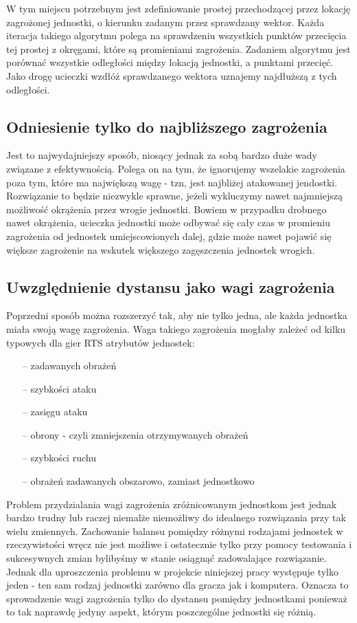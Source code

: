 \documentclass[12pt]{report}
\begin{document}
W tym miejscu potrzebnym jest zdefiniowanie prostej przechodzącej przez lokację zagrożonej jednostki, o kierunku zadanym przez sprawdzany wektor. Każda iteracja takiego algorytmu polega na sprawdzeniu wszystkich punktów przecięcia tej prostej z okręgami, które są promieniami zagrożenia. Zadaniem algorytmu jest porównać wszystkie odległości między lokacją jednostki, a punktami przecięć. Jako drogę ucieczki wzdłóż sprawdzanego wektora uznajemy najdłuższą z tych odległości.

\subsection{Odniesienie tylko do najbliższego zagrożenia}
Jest to najwydajniejszy sposób, niosący jednak za sobą bardzo duże wady związane z efektywnością. Polega on na tym, że ignorujemy wszelakie zagrożenia poza tym, które ma największą wagę - tzn, jest najbliżej atakowanej jendostki. Rozwiązanie to będzie niezwykle sprawne, jeżeli wykluczymy nawet najmniejszą możliwość okrążenia przez wrogie jednostki. Bowiem w przypadku drobnego nawet okrążenia, ucieczka jednostki może odbywać się cały czas w promieniu zagrożenia od jednostek umiejscowionych dalej, gdzie może nawet pojawić się większe zagrożenie na wskutek większego zagęszczenia jednostek wrogich.
\subsection{Uwzględnienie dystansu jako wagi zagrożenia}
Poprzedni sposób można rozszerzyć tak, aby nie tylko jedna, ale każda jednostka miała swoją wagę zagrożenia. Waga takiego zagrożenia mogłaby zależeć od kilku typowych dla gier RTS atrybutów jednostek:
\begin{itemize}
\item[--] zadawanych obrażeń
\item[--] szybkości ataku
\item[--] zasięgu ataku
\item[--] obrony - czyli zmniejszenia otrzymywanych obrażeń
\item[--] szybkości ruchu
\item[--] obrażeń zadawanych obszarowo, zamiast jednostkowo
\end{itemize}
Problem przydzialania wagi zagrożenia zróżnicowanym jednostkom jest jednak bardzo trudny lub raczej niemalże niemożliwy do idealnego rozwiązania przy tak wielu zmiennych. Zachowanie balansu pomiędzy różnymi rodzajami jednostek w rzeczywistości wręcz nie jest możliwe i ostatecznie tylko przy pomocy testowania i sukcesywnych zmian bylibyśmy w stanie osiągnąć zadowalające rozwiązanie. 
Jednak dla uproszczenia problemu w projekcie niniejszej pracy występuje tylko jeden - ten sam rodzaj jednostki zarówno dla gracza jak i komputera. Oznacza to sprowadzenie wagi zagrożenia tylko do dystansu pomiędzy jednostkami ponieważ to tak naprawdę jedyny aspekt, którym poszczególne jednostki się różnią. 
\end{document}
